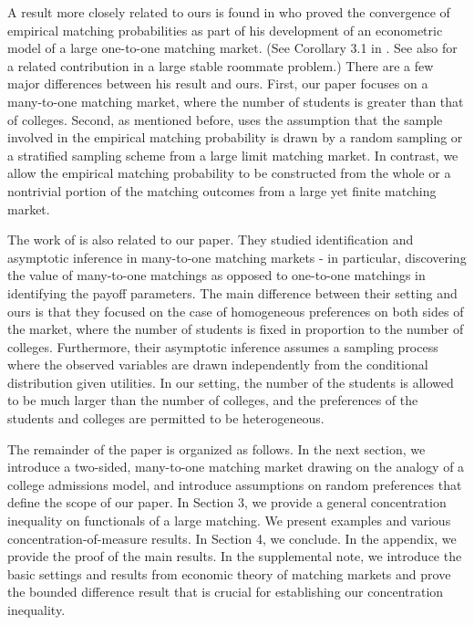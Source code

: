 \documentclass[12pt, fullpage]{amsart}
\theoremstyle{definition}
\theoremstyle{definition}
\theoremstyle{definition}
\begin{document}
\begin{bibunit}[econometrica]
    A result more closely related to ours is found in \cite{Menzel:2015:Eca} who proved the convergence of empirical matching probabilities as part of his development of an econometric model of a large one-to-one matching market. (See Corollary 3.1 in \cite{Menzel:2015:Eca}. See also \cite{Peski:2017:JET} for a related contribution in a large stable roommate problem.) There are a few major differences between his result and ours. First, our paper focuses on a many-to-one matching market, where the number of students is greater than that of colleges. Second, as mentioned before, \cite{Menzel:2015:Eca} uses the assumption that the sample involved in the empirical matching probability is drawn by a random sampling or a stratified sampling scheme from a large limit matching market. In contrast, we allow the empirical matching probability to be constructed from the whole or a nontrivial portion of the matching outcomes from a large yet finite matching market.
            
    The work of \cite{Diamond/Agarwal:2017:QE} is also related to our paper. They studied identification and asymptotic inference in many-to-one matching markets - in particular, discovering the value of many-to-one matchings as opposed to one-to-one matchings in identifying the payoff parameters. The main difference between their setting and ours is that they focused on the case of homogeneous preferences on both sides of the market, where the number of students is fixed in proportion to the number of colleges. Furthermore, their asymptotic inference assumes a sampling process where the observed variables are drawn independently from the conditional distribution given utilities. In our setting, the number of the students is allowed to be much larger than the number of colleges, and the preferences of the students and colleges are permitted to be heterogeneous.
    
    The remainder of the paper is organized as follows. In the next section,  we introduce a two-sided, many-to-one matching market drawing on the analogy of a college admissions model, and introduce assumptions on random preferences that define the scope of our paper. In Section 3, we provide a general concentration inequality on functionals of a large matching. We present examples and various concentration-of-measure results. In Section 4, we conclude. In the appendix, we provide the proof of the main results. In the supplemental note, we introduce the basic settings and results from economic theory of matching markets and prove the bounded difference result that is crucial for establishing our concentration inequality.
    

\end{bibunit}
\end{document}
